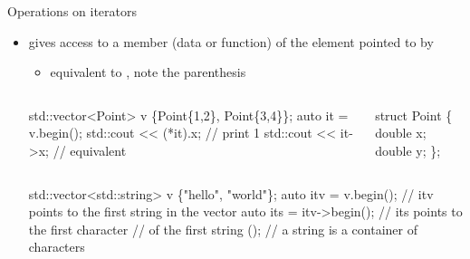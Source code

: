 \begin{frame}[fragile]{Operations on iterators \insertcontinuationtext}

  \begin{itemize}
  \item {} gives access to a member (data or
    function) of the element pointed to by 
    \begin{itemize}
    \item equivalent to , note the parenthesis
    \end{itemize}

    \begin{columns}
      \begin{column}{.7\textwidth}
        \begin{codeblock}
std::vector<Point> v \{Point\{1,2\}, Point\{3,4\}\};
auto it = v.begin();
std::cout << (*it).x; // print 1
std::cout << it->x;   // equivalent\end{codeblock}
      \end{column}
      \begin{column}{.2\textwidth}
        \begin{codeblock}
struct Point \{
  double x;
  double y;
\};\end{codeblock}
      \end{column}
    \end{columns}

    \begin{codeblock}
std::vector<std::string> v \{"hello", "world"\};
auto itv = v.begin();    // itv points to the first string in the vector
auto its = itv->begin(); // its points to the first character
                         //   of the first string ();
                         //   a string is a container of characters\end{codeblock}
  \end{itemize}
\end{frame}

